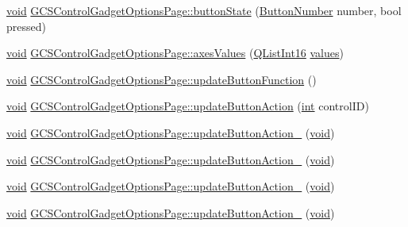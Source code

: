 \begin{DoxyCompactItemize}
\item 
\hyperlink{group___u_a_v_objects_plugin_ga444cf2ff3f0ecbe028adce838d373f5c}{void} \hyperlink{group___g_c_s_control_gadget_plugin_gaa59744420fc5100a14c1f340a163484e}{G\-C\-S\-Control\-Gadget\-Options\-Page\-::button\-State} (\hyperlink{sdlgamepad_8h_a2054e2a6e47649b0ab9d043afda9133f}{Button\-Number} number, bool pressed)
\item 
\hyperlink{group___u_a_v_objects_plugin_ga444cf2ff3f0ecbe028adce838d373f5c}{void} \hyperlink{group___g_c_s_control_gadget_plugin_ga2875164469455c55a959fcd1f56b0e6d}{G\-C\-S\-Control\-Gadget\-Options\-Page\-::axes\-Values} (\hyperlink{sdlgamepad_8h_a0cff90f48b1cb30ecb36bbfea594b50b}{Q\-List\-Int16} \hyperlink{glext_8h_a300a8ed5fb9490aa35713406ec0412df}{values})
\item 
\hyperlink{group___u_a_v_objects_plugin_ga444cf2ff3f0ecbe028adce838d373f5c}{void} \hyperlink{group___g_c_s_control_gadget_plugin_ga98bbb0244baf8177656bc529e5b421a9}{G\-C\-S\-Control\-Gadget\-Options\-Page\-::update\-Button\-Function} ()
\item 
\hyperlink{group___u_a_v_objects_plugin_ga444cf2ff3f0ecbe028adce838d373f5c}{void} \hyperlink{group___g_c_s_control_gadget_plugin_ga9f6949caad5edd88b24436348e3d73b3}{G\-C\-S\-Control\-Gadget\-Options\-Page\-::update\-Button\-Action} (\hyperlink{ioapi_8h_a787fa3cf048117ba7123753c1e74fcd6}{int} control\-I\-D)
\item 
\hyperlink{group___u_a_v_objects_plugin_ga444cf2ff3f0ecbe028adce838d373f5c}{void} \hyperlink{group___g_c_s_control_gadget_plugin_ga849965b0456db4a2de097fcb4989f41a}{G\-C\-S\-Control\-Gadget\-Options\-Page\-::update\-Button\-Action\-\_} (\hyperlink{group___u_a_v_objects_plugin_ga444cf2ff3f0ecbe028adce838d373f5c}{void})
\item 
\hyperlink{group___u_a_v_objects_plugin_ga444cf2ff3f0ecbe028adce838d373f5c}{void} \hyperlink{group___g_c_s_control_gadget_plugin_ga70d72214e80e72b7cb944bec376e1d0c}{G\-C\-S\-Control\-Gadget\-Options\-Page\-::update\-Button\-Action\-\_} (\hyperlink{group___u_a_v_objects_plugin_ga444cf2ff3f0ecbe028adce838d373f5c}{void})
\item 
\hyperlink{group___u_a_v_objects_plugin_ga444cf2ff3f0ecbe028adce838d373f5c}{void} \hyperlink{group___g_c_s_control_gadget_plugin_gaa5dc90f10992f27d651980287df92744}{G\-C\-S\-Control\-Gadget\-Options\-Page\-::update\-Button\-Action\-\_} (\hyperlink{group___u_a_v_objects_plugin_ga444cf2ff3f0ecbe028adce838d373f5c}{void})
\item 
\hyperlink{group___u_a_v_objects_plugin_ga444cf2ff3f0ecbe028adce838d373f5c}{void} \hyperlink{group___g_c_s_control_gadget_plugin_gae9f48cda98010eea595957d5674e7df3}{G\-C\-S\-Control\-Gadget\-Options\-Page\-::update\-Button\-Action\-\_} (\hyperlink{group___u_a_v_objects_plugin_ga444cf2ff3f0ecbe028adce838d373f5c}{void})

\end{DoxyCompactItemize}
